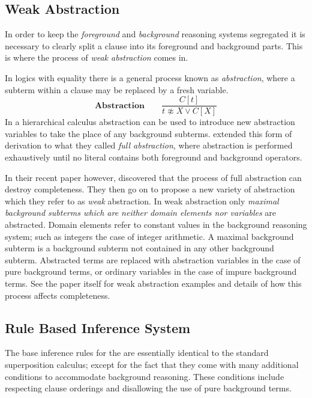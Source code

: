 
\subsection{Weak Abstraction}
In order to keep the \emph{foreground} and \emph{background} reasoning
systems segregated it is necessary to clearly split a clause into its foreground
and background parts. This is where the process of \emph{weak abstraction} comes in.

In logics with equality there is a general process known as \emph{abstraction},
where a subterm within a clause may be replaced by a fresh variable.
\[\textbf{Abstraction}\quad\quad \frac{C[t]}{t\not\approx X \lor C[X]}\]
In a hierarchical calculus abstraction can be used to introduce new abstraction variables to take the place
of any background subterms.  extended this form of derivation to what they called \emph{full abstraction},
where abstraction is performed exhaustively until no literal contains both foreground
and background operators.

In their recent paper however,  discovered that the process 
of full abstraction can destroy completeness. They then go on to propose a new
variety of abstraction which they refer to as \emph{weak} abstraction. 
In weak abstraction only \emph{maximal background subterms which are
neither domain elements nor variables} are abstracted. Domain elements refer
to constant values in the background reasoning system; such as integers the case of
integer arithmetic. A maximal background subterm
is a background subterm not contained in any other background subterm. Abstracted terms are replaced
with abstraction variables in the case of pure background terms, or ordinary variables
in the case of impure background terms. See the paper itself for weak abstraction
examples and details of how this process affects completeness.

\subsection{Rule Based Inference System}
\label{sec:calc}

The base inference rules for the {\HSWAC} are essentially identical to the standard 
superposition calculus; except for the fact that they come with many additional
conditions to accommodate background reasoning. These conditions include respecting
clause orderings and disallowing the use of pure background terms.

